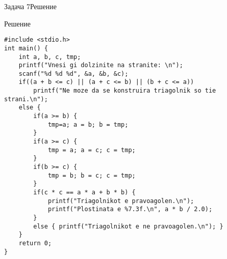 \begin{frame}[fragile]{Задача 7}{Решение}
	\begin{exampleblock}{Решение}
		\begin{lstlisting}
#include <stdio.h> 
int main() {
    int a, b, c, tmp;
    printf("Vnesi gi dolzinite na stranite: \n");
    scanf("%d %d %d", &a, &b, &c);
    if((a + b <= c) || (a + c <= b) || (b + c <= a))
        printf("Ne moze da se konstruira triagolnik so tie strani.\n");
    else {
        if(a >= b) {
            tmp=a; a = b; b = tmp;
        }
        if(a >= c) {
            tmp = a; a = c; c = tmp;
        }
        if(b >= c) {
            tmp = b; b = c; c = tmp;
        }
        if(c * c == a * a + b * b) {
            printf("Triagolnikot e pravoagolen.\n");
            printf("Plostinata e %7.3f.\n", a * b / 2.0);
        }
        else { printf("Triagolnikot e ne pravoagolen.\n"); }
    }
    return 0;
}
		\end{lstlisting}
	\end{exampleblock}
\end{frame}

